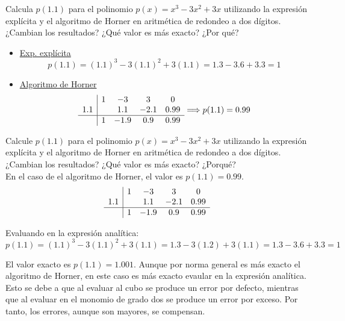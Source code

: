 \begin{ejercicio}
    Calcula $p(1.1)$ para el polinomio $p(x)=x^3-3x^2+3x$ utilizando la expresión explícita y el algoritmo de Horner en aritmética de redondeo a dos dígitos. ¿Cambian los resultados? ¿Qué valor es más exacto? ¿Por qué?
    \begin{itemize}
    \item\underline{Exp. explícita}\\
    \begin{equation*}
        p(1.1) = (1.1)^3 - 3(1.1)^2+3(1.1) = 1.3 -3.6 +3.3 = 1
    \end{equation*}
    \item\underline{Algoritmo de Horner}\\
    \begin{equation*}
        \begin{array}{c|ccccc}
                & 1 & -3 & 3 & 0 \\
            1.1 &   & 1.1 & -2.1 & 0.99\\          \hline
            & 1 & -1.9 & 0.9 & 0.99
        \end{array} \Longrightarrow p(1.1) = 0.99
    \end{equation*}
    \end{itemize}
\end{ejercicio}

\begin{ejercicio}
    Calcule $p(1.1)$ para el polinomio $p(x) = x^3 -3 x^2 + 3 x$ utilizando la expresión explícita y el algoritmo de Horner en aritmética de redondeo a dos dígitos. ¿Cambian los resultados? ¿Qué valor es más exacto? ¿Porqué?\\

    En el caso de el algoritmo de Horner, el valor es $p(1.1)=0.99$.
    \begin{equation*}
        \begin{array}{c|cccc}
             & 1 & -3 & 3 & 0 \\
            1.1  & & 1.1 & -2.1 & 0.99\\ \hline
            & 1 & -1.9 & 0.9 & 0.99
        \end{array}
    \end{equation*}

    Evaluando en la expresión analítica:
    \begin{equation*}
        p(1.1)=(1.1)^3 -3 (1.1)^2 + 3 (1.1) = 1.3 -3(1.2) + 3(1.1) = 1.3 -3.6 + 3.3 = 1
    \end{equation*}

    El valor exacto es $p(1.1)=1.001$. Aunque por norma general es más exacto el algoritmo de Horner, en este caso es más exacto evaular en la expresión analítica. Esto se debe a que al evaluar al cubo se produce un error por defecto, mientras que al evaluar en el monomio de grado dos se produce un error por exceso. Por tanto, los errores, aunque son mayores, se compensan.
\end{ejercicio}

